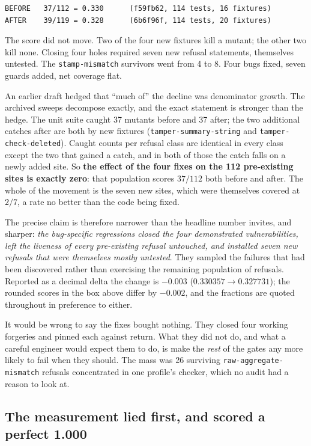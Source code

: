 \documentclass[11pt]{article}
\begin{document}
\begin{Verbatim}[frame=single,fontsize=\small]
BEFORE   37/112 = 0.330      (f59fb62, 114 tests, 16 fixtures)
AFTER    39/119 = 0.328      (6b6f96f, 114 tests, 20 fixtures)
\end{Verbatim}

The score did not move. Two of the four new fixtures kill a mutant; the other two kill none.
Closing four holes required seven new refusal statements, themselves untested. The
\texttt{stamp-mismatch} survivors went from 4 to 8. Four bugs fixed, seven guards added, net
coverage flat.

An earlier draft hedged that ``much of'' the decline was denominator growth. The archived
sweeps decompose exactly, and the exact statement is stronger than the hedge. The unit
suite caught 37 mutants before and 37 after; the two additional catches after are both by
new fixtures (\texttt{tamper-summary-string} and \texttt{tamper-check-deleted}). Caught
counts per refusal class are identical in every class except the two that gained a catch,
and in both of those the catch falls on a newly added site. So \textbf{the effect of the four
fixes on the 112 pre-existing sites is exactly zero}: that population scores $37/112$ both
before and after. The whole of the movement is the seven new sites, which were themselves
covered at $2/7$, a rate no better than the code being fixed.

The precise claim is therefore narrower than the headline number invites, and sharper:
\emph{the bug-specific regressions closed the four demonstrated vulnerabilities, left the
liveness of every pre-existing refusal untouched, and installed seven new refusals that
were themselves mostly untested}. They sampled the failures that had been discovered rather
than exercising the remaining population of refusals. Reported as a decimal delta the
change is $-0.003$ ($0.330357 \rightarrow 0.327731$); the rounded scores in the box above
differ by $-0.002$, and the fractions are quoted throughout in preference to either.

It would be wrong to say the fixes bought nothing. They closed four working forgeries and
pinned each against return. What they did not do, and what a careful engineer would expect
them to do, is make the \emph{rest} of the gates any more likely to fail when they should.
The mass was 26 surviving \texttt{raw-aggregate-mismatch} refusals concentrated in one
profile's checker, which no audit had a reason to look at.

\subsection{The measurement lied first, and scored a perfect 1.000}
\label{sec:vacuous1000}
\end{document}
